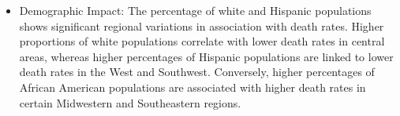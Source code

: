 \documentclass[
]{article}
\providecommand{\tightlist}{%
  \setlength{\itemsep}{0pt}\setlength{\parskip}{0pt}}\usepackage{longtable,booktabs,array}
\begin{document}
\begin{figure}

\begin{minipage}{0.50\linewidth}



\end{minipage}%
%
\begin{minipage}{0.50\linewidth}



\end{minipage}%
\newline
\begin{minipage}{0.50\linewidth}



\end{minipage}%
%
\begin{minipage}{0.50\linewidth}



\end{minipage}%

\end{figure}%

\begin{itemize}
\tightlist
\item
  Demographic Impact: The percentage of white and Hispanic populations
  shows significant regional variations in association with death rates.
  Higher proportions of white populations correlate with lower death
  rates in central areas, whereas higher percentages of Hispanic
  populations are linked to lower death rates in the West and Southwest.
  Conversely, higher percentages of African American populations are
  associated with higher death rates in certain Midwestern and
  Southeastern regions.
\end{itemize}
\end{document}
